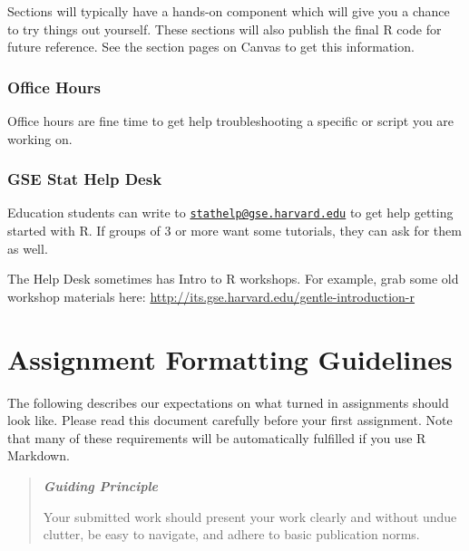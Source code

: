 \documentclass[
  letterpaper,
  DIV=11,
  numbers=noendperiod]{scrreprt}
\begin{document}
Sections will typically have a hands-on component which will give you a
chance to try things out yourself. These sections will also publish the
final R code for future reference. See the section pages on Canvas to
get this information.

\subsection*{Office Hours}\label{office-hours}

Office hours are fine time to get help troubleshooting a specific or
script you are working on.

\subsection*{GSE Stat Help Desk}\label{gse-stat-help-desk}

Education students can write to
\href{mailto:stathelp@gse.harvard.edu}{\nolinkurl{stathelp@gse.harvard.edu}}
to get help getting started with R. If groups of 3 or more want some
tutorials, they can ask for them as well.

The Help Desk sometimes has Intro to R workshops. For example, grab some
old workshop materials here:
\url{http://its.gse.harvard.edu/gentle-introduction-r}


\chapter*{Assignment Formatting
Guidelines}\label{assignment-formatting-guidelines}


The following describes our expectations on what turned in assignments
should look like. Please read this document carefully before your first
assignment. Note that many of these requirements will be automatically
fulfilled if you use R Markdown.

\begin{quote}
\textbf{\emph{Guiding Principle}}

Your submitted work should present your work clearly and without undue
clutter, be easy to navigate, and adhere to basic publication norms.
\end{quote}
\end{document}
